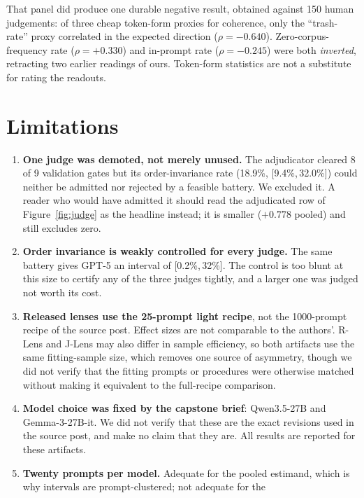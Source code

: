 \documentclass[11pt]{article}
\newcommand{\ci}[2]{[#1,\,#2]}
\begin{document}
That panel did produce one durable negative result, obtained against 150 human
judgements: of three cheap token-form proxies for coherence, only the
``trash-rate'' proxy correlated in the expected direction ($\rho = -0.640$).
Zero-corpus-frequency rate ($\rho = +0.330$) and in-prompt rate
($\rho = -0.245$) were both \emph{inverted}, retracting two earlier readings of
ours. Token-form statistics are not a substitute for rating the readouts.

\section{Limitations}

\begin{enumerate}[leftmargin=*]
\item \textbf{One judge was demoted, not merely unused.} The adjudicator
      cleared 8 of 9 validation gates but its order-invariance rate
      (18.9\%, \ci{9.4\%}{32.0\%}) could neither be admitted nor rejected by a
      feasible battery. We excluded it. A reader who would have admitted it
      should read the adjudicated row of Figure~\ref{fig:judge} as the headline
      instead; it is smaller ($+0.778$ pooled) and still excludes zero.
\item \textbf{Order invariance is weakly controlled for every judge.} The same
      battery gives GPT-5 an interval of \ci{0.2\%}{32\%}. The control is too
      blunt at this size to certify any of the three judges tightly, and a
      larger one was judged not worth its cost.
\item \textbf{Released lenses use the 25-prompt light recipe}, not the
      1000-prompt recipe of the source post. Effect sizes are not comparable to
      the authors'. R-Lens and J-Lens may also differ in sample efficiency, so
      both artifacts use the same fitting-sample size, which removes one source of
      asymmetry, though we did not verify that the fitting prompts or procedures
      were otherwise matched
      without making it equivalent to the full-recipe comparison.
\item \textbf{Model choice was fixed by the capstone brief}: Qwen3.5-27B and
      Gemma-3-27B-it. We did not verify that these are the exact revisions used
      in the source post, and make no claim that they are. All results are
      reported for these artifacts.
\item \textbf{Twenty prompts per model.} Adequate for the pooled estimand,
      which is why intervals are prompt-clustered; not adequate for the

\end{enumerate}
\end{document}
